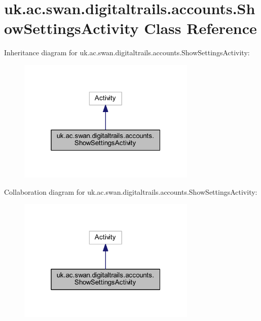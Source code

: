 \hypertarget{classuk_1_1ac_1_1swan_1_1digitaltrails_1_1accounts_1_1_show_settings_activity}{\section{uk.\+ac.\+swan.\+digitaltrails.\+accounts.\+Show\+Settings\+Activity Class Reference}
\label{classuk_1_1ac_1_1swan_1_1digitaltrails_1_1accounts_1_1_show_settings_activity}
}


Inheritance diagram for uk.\+ac.\+swan.\+digitaltrails.\+accounts.\+Show\+Settings\+Activity\+:\nopagebreak
\begin{figure}[H]
\begin{center}
\leavevmode
\includegraphics[width=241pt]{classuk_1_1ac_1_1swan_1_1digitaltrails_1_1accounts_1_1_show_settings_activity__inherit__graph}
\end{center}
\end{figure}


Collaboration diagram for uk.\+ac.\+swan.\+digitaltrails.\+accounts.\+Show\+Settings\+Activity\+:\nopagebreak
\begin{figure}[H]
\begin{center}
\leavevmode
\includegraphics[width=241pt]{classuk_1_1ac_1_1swan_1_1digitaltrails_1_1accounts_1_1_show_settings_activity__coll__graph}
\end{center}
\end{figure}
